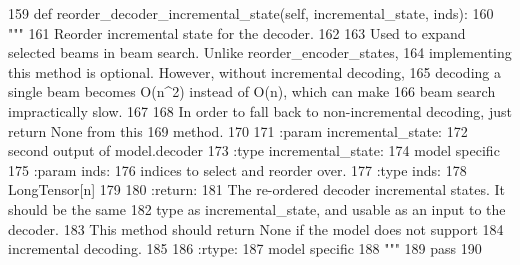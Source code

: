 \begin{DoxyCode}
159     \textcolor{keyword}{def }reorder\_decoder\_incremental\_state(self, incremental\_state, inds):
160         \textcolor{stringliteral}{"""}
161 \textcolor{stringliteral}{        Reorder incremental state for the decoder.}
162 \textcolor{stringliteral}{}
163 \textcolor{stringliteral}{        Used to expand selected beams in beam search. Unlike reorder\_encoder\_states,}
164 \textcolor{stringliteral}{        implementing this method is optional. However, without incremental decoding,}
165 \textcolor{stringliteral}{        decoding a single beam becomes O(n^2) instead of O(n), which can make}
166 \textcolor{stringliteral}{        beam search impractically slow.}
167 \textcolor{stringliteral}{}
168 \textcolor{stringliteral}{        In order to fall back to non-incremental decoding, just return None from this}
169 \textcolor{stringliteral}{        method.}
170 \textcolor{stringliteral}{}
171 \textcolor{stringliteral}{        :param incremental\_state:}
172 \textcolor{stringliteral}{            second output of model.decoder}
173 \textcolor{stringliteral}{        :type incremental\_state:}
174 \textcolor{stringliteral}{            model specific}
175 \textcolor{stringliteral}{        :param inds:}
176 \textcolor{stringliteral}{            indices to select and reorder over.}
177 \textcolor{stringliteral}{        :type inds:}
178 \textcolor{stringliteral}{            LongTensor[n]}
179 \textcolor{stringliteral}{}
180 \textcolor{stringliteral}{        :return:}
181 \textcolor{stringliteral}{            The re-ordered decoder incremental states. It should be the same}
182 \textcolor{stringliteral}{            type as incremental\_state, and usable as an input to the decoder.}
183 \textcolor{stringliteral}{            This method should return None if the model does not support}
184 \textcolor{stringliteral}{            incremental decoding.}
185 \textcolor{stringliteral}{}
186 \textcolor{stringliteral}{        :rtype:}
187 \textcolor{stringliteral}{            model specific}
188 \textcolor{stringliteral}{        """}
189         \textcolor{keywordflow}{pass}
190 
\end{DoxyCode}
\mbox{\label{classparlai_1_1core_1_1torch__generator__agent_1_1TorchGeneratorModel_a9ed5aecabe977856b4c385ba74fa6107}} 
